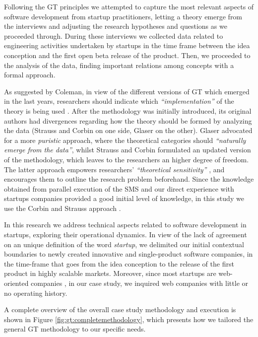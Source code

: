 \documentclass[10pt,journal,letterpaper,compsoc]{IEEEtran}
\begin{document}
Following the GT principles we attempted to capture the most relevant aspects 
of software development from startup practitioners, letting a theory emerge 
from the interviews and adjusting the research hypotheses and questions as we 
proceeded through. During these interviews we collected data related to 
engineering activities undertaken by startups in the time frame between the idea 
conception and the first open beta release of the product.  Then, we proceeded 
to the analysis of the data, finding important relations among concepts with a 
formal approach.

As suggested by Coleman, in view of the different versions of GT which emerged 
in the last years, researchers should indicate which \textit{``implementation''} 
of the theory is being used \cite{Coleman2007}. After the methodology was 
initially introduced, its original authors  had divergences regarding how the 
theory should be formed by analyzing the data (Strauss and Corbin on one side, 
Glaser on the other).  Glaser advocated for a more \textit{puristic} approach, 
where the theoretical categories should \textit{``naturally emerge from the 
data''}, whilst Strauss and Corbin formulated an updated version of the 
methodology, which leaves to the researchers an higher degree of freedom. The 
latter approach empowers researchers' \textit{``theoretical sensitivity''} 
\cite{Corbin1990}, and encourages them to outline the research problem 
beforehand. Since the knowledge obtained from parallel execution of the SMS 
\cite{SMS} and our direct experience with startups companies provided a good 
initial level of knowledge, in this study we use the Corbin and Strauss 
approach \cite{Strauss1998}.

In this research we address technical aspects related to software development 
in startups, exploring their operational dynamics. In view of the lack of 
agreement on an unique definition of the word \textit{startup}, we delimited our 
initial contextual boundaries to newly created innovative and single-product 
software companies, in the time-frame that goes from the idea conception to the 
release of the first product in highly scalable markets. Moreover, since most 
startups are web-oriented companies \cite{tc-webstartups-link, Allen2003}, in 
our case study, we inquired web companies with little or no operating history.

A complete overview of the overall case study methodology and execution is 
shown in Figure \ref{fig:gt:completemethodology}, which presents how we tailored 
the general GT methodology to our specific needs.
\end{document}
